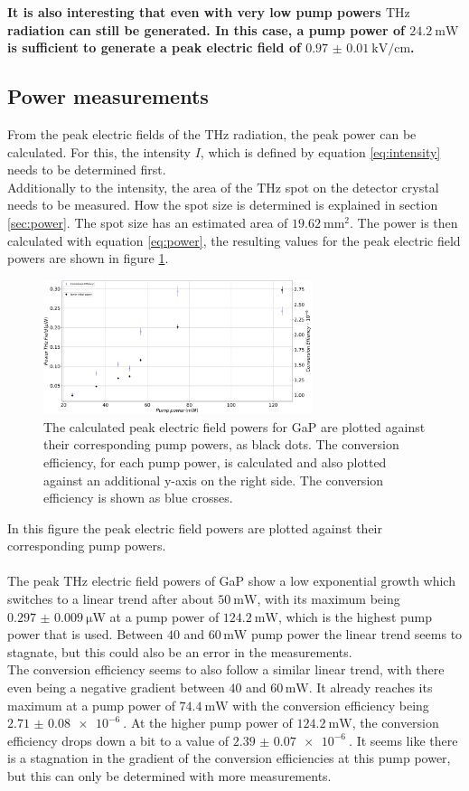 \textbf{It is also interesting that even with very low pump powers $\si{\tera\hertz}$ radiation can still be generated.
In this case, a pump power of $\SI{24.2}{\milli\W}$ is sufficient to generate a peak electric field of $\SI{0.97(1)}{\kilo\V\per\centi\meter}$.}
\FloatBarrier
\subsection{Power measurements}
From the peak electric fields of the $\si{\tera\hertz}$ radiation, the peak power can be calculated.
For this, the intensity $I$, which is defined by equation \eqref{eq:intensity} needs to be determined first.
\\
Additionally to the intensity, the area of the $\si{\tera\hertz}$ spot on the detector crystal needs to be measured.
How the spot size is determined is explained in section \ref{sec:power}.
The spot size has an estimated area of $\SI{19.62}{\milli\meter\squared}$.
The power is then calculated with equation \eqref{eq:power}, the resulting values for the peak electric field powers are shown in figure \ref{fig:gap_power}.
\begin{figure}
    \centering
    \includegraphics[width=0.7\textwidth]{Plots/Powergap.pdf}
    \caption{The calculated peak electric field powers for GaP are plotted against their corresponding pump powers, as black dots.
    The conversion efficiency, for each pump power, is calculated and also plotted against an additional y-axis on the right side.
    The conversion efficiency is shown as blue crosses.}
    \label{fig:gap_power}
\end{figure}
In this figure the peak electric field powers are plotted against their corresponding pump powers.
\\\\
The peak $\si{\tera\hertz}$ electric field powers of GaP show a low exponential growth which switches to a linear trend after about $\SI{50}{\milli\W}$, with its maximum being $\SI{0.297(9)}{\micro\W}$ at a pump power of $\SI{124.2}{\milli\W}$, which is the highest pump power that is used.
Between $40$ and $60 \, \si{\milli\W}$ pump power the linear trend seems to stagnate, but this could also be an error in the measurements.
\\
The conversion efficiency seems to also follow a similar linear trend, with there even being a negative gradient between  $40$ and $60 \, \si{\milli\W}$.
It already reaches its maximum at a pump power of $\SI{74.4}{\milli\W}$ with the conversion efficiency being $\SI{2.71(8)e-6}{}$.
At the higher pump power of $\SI{124.2}{\milli\W}$, the conversion efficiency drops down a bit to a value of $\SI{2.39(7)e-6}{}$.
It seems like there is a stagnation in the gradient of the conversion efficiencies at this pump power, but this can only be determined with more measurements.
\FloatBarrier
